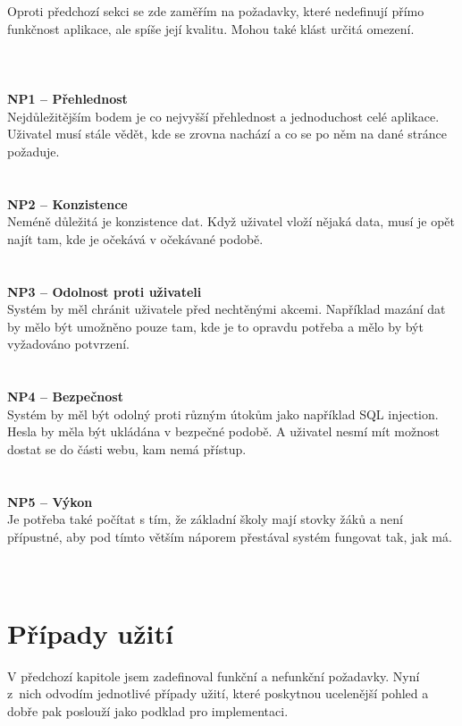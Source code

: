 \documentclass[twoside]{ctuthesis}
\theoremstyle{plain}
\theoremstyle{definition}
\theoremstyle{note}
\begin{document}
Oproti předchozí sekci se zde zaměřím na požadavky, které nedefinují přímo funkčnost aplikace, ale spíše její kvalitu. Mohou také klást určitá omezení.
\\\\\\\\
\textbf{\Large NP1 -- Přehlednost}\\
Nejdůležitějším bodem je co nejvyšší přehlednost a jednoduchost celé aplikace. Uživatel musí stále vědět, kde se zrovna nachází a co se po něm na dané stránce požaduje.
\\\\\\
\textbf{\Large NP2 -- Konzistence}\\
Neméně důležitá je konzistence dat. Když uživatel vloží nějaká data, musí je opět najít tam, kde je očekává v očekávané podobě.
\\\\\\
\textbf{\Large NP3 -- Odolnost proti uživateli}\\
Systém by měl chránit uživatele před nechtěnými akcemi. Například mazání dat by mělo být umožněno pouze tam, kde je to opravdu potřeba a mělo by být vyžadováno potvrzení.
\\\\\\
\textbf{\Large NP4 -- Bezpečnost}\\
Systém by měl být odolný proti různým útokům jako například SQL injection. Hesla by měla být ukládána v bezpečné podobě. A uživatel nesmí mít možnost dostat se do části webu, kam nemá přístup.
\\\\\\
\textbf{\Large NP5 -- Výkon}\\
Je potřeba také počítat s tím, že základní školy mají stovky žáků a není přípustné, aby pod tímto větším náporem přestával systém fungovat tak, jak má. 
\\\\\\





\chapter{Případy užití}
\label{chap:pripady_uziti}

V předchozí kapitole jsem zadefinoval funkční a nefunkční požadavky. Nyní z~nich odvodím jednotlivé případy užití, které poskytnou ucelenější pohled a dobře pak poslouží jako podklad pro implementaci.
\end{document}
